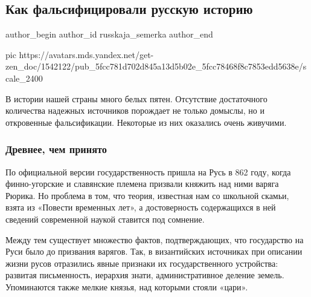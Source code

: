  
 
 
 
 
 
\subsection{Как фальсифицировали русскую историю}
\label{sec:06_12_2020.sites.ru.zen_yandex.russkaja_semerka.1.falsifikacija_rus_istoria}
\ifcmt
	author_begin
   author_id russkaja_semerka
	author_end
\fi

\ifcmt
pic https://avatars.mds.yandex.net/get-zen_doc/1542122/pub_5fcc781d702d845a13d5b02e_5fcc78468f8c7853edd5638e/scale_2400
\fi


В истории нашей страны много белых пятен. Отсутствие достаточного количества
надежных источников порождает не только домыслы, но и откровенные
фальсификации. Некоторые из них оказались очень живучими.

\subsubsection{Древнее, чем принято}

По официальной версии государственность пришла на Русь в 862 году, когда
финно-угорские и славянские племена призвали княжить над ними варяга Рюрика. Но
проблема в том, что теория, известная нам со школьной скамьи, взята из «Повести
временных лет», а достоверность содержащихся в ней сведений современной наукой
ставится под сомнение.

Между тем существует множество фактов, подтверждающих, что государство на Руси
было до призвания варягов. Так, в византийских источниках при описании жизни
русов отразились явные признаки их государственного устройства: развитая
письменность, иерархия знати, административное деление земель. Упоминаются
также мелкие князья, над которыми стояли «цари».


